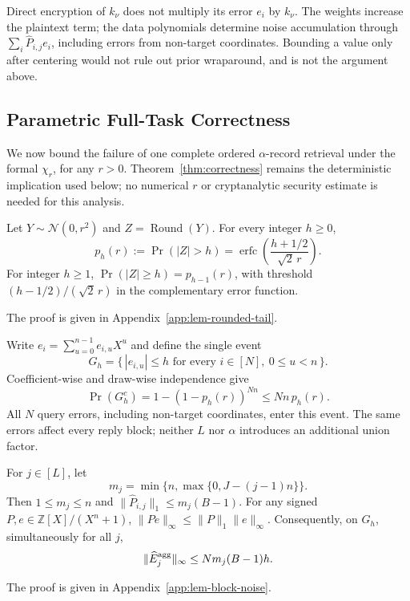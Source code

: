 Direct encryption of \(k_{\nu}\) does not multiply its error \(e_i\) by \(k_{\nu}\).
The weights increase the plaintext term; the data polynomials determine
noise accumulation through \(\sum_i\widehat P_{i,j}e_i\), including errors
from non-target coordinates. Bounding a value only after centering would
not rule out prior wraparound, and is not the argument above.

\subsection{Parametric Full-Task Correctness}
\label{sec:parametric-correctness}
We now bound the failure of one complete ordered \(\alpha\)-record
retrieval under the formal \(\chi_r\), for any \(r>0\). Theorem~\ref{thm:correctness}
remains the deterministic implication used below; no numerical \(r\)
or cryptanalytic security estimate is needed for this analysis.

\begin{lemma}
\label{lem:rounded-tail}
Let \(Y\sim\mathcal N(0,r^2)\) and \(Z=\operatorname{Round}(Y)\).
For every integer \(h\ge0\),
\begin{equation}
\label{eq:rounded-strict-tail}
 p_h(r):=\Pr(|Z|>h)
 =\operatorname{erfc}\!\left(\frac{h+1/2}{\sqrt2\,r}\right).
\end{equation}
For integer \(h\ge1\), \(\Pr(|Z|\ge h)=p_{h-1}(r)\), with threshold
\((h-1/2)/(\sqrt2\,r)\) in the complementary error function.
\end{lemma}
The proof is given in Appendix~\ref{app:lem-rounded-tail}.


Write \(e_i=\sum_{u=0}^{n-1}e_{i,u}X^u\) and define the single event
\begin{equation}
\label{eq:global-good-event}
 G_h=\{\,|e_{i,u}|\le h\text{ for every }i\in[N],\ 0\le u<n\,\}.
\end{equation}
Coefficient-wise and draw-wise independence give
\begin{equation}
\label{eq:global-event-probability}
 \Pr(G_h^c)=1-(1-p_h(r))^{Nn}\le Nn\,p_h(r).
\end{equation}
All \(N\) query errors, including non-target coordinates, enter this event.
The same errors affect every reply block; neither \(L\) nor \(\alpha\)
introduces an additional union factor.

\begin{lemma}
\label{lem:block-noise}
For \(j\in[L]\), let
\[
 m_j=\min\{n,\max\{0,J-(j-1)n\}\}.
\]
Then \(1\le m_j\le n\) and
\(\|\widehat P_{i,j}\|_1\le m_j(B-1)\).
For any signed \(P,e\in\mathbb Z[X]/(X^n+1)\),
\(\|Pe\|_\infty\le\|P\|_1\|e\|_\infty\).
Consequently, on \(G_h\), simultaneously for all \(j\),
\begin{equation}
\label{eq:aggregate-good-event-bound}
 \|\widehat E_j^{\rm agg}\|_\infty\le N m_j(B-1)h.
\end{equation}
\end{lemma}
The proof is given in Appendix~\ref{app:lem-block-noise}.


